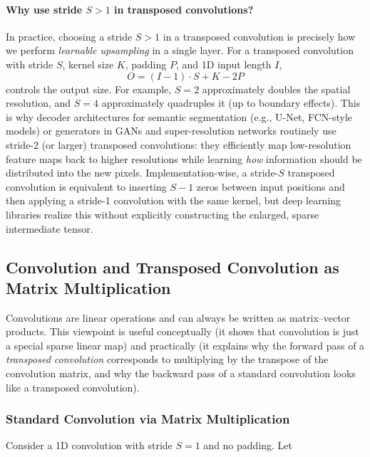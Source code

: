 \paragraph{Why use stride \(S>1\) in transposed convolutions?}
\noindent
In practice, choosing a stride \(S>1\) in a transposed convolution is precisely how we perform \emph{learnable upsampling} in a single layer. For a transposed convolution with stride \(S\), kernel size \(K\), padding \(P\), and 1D input length \(I\),
\[
O = (I - 1)\cdot S + K - 2P
\]
controls the output size. For example, \(S=2\) approximately doubles the spatial resolution, and \(S=4\) approximately quadruples it (up to boundary effects). This is why decoder architectures for semantic segmentation (e.g., U-Net, FCN-style models) or generators in GANs and super-resolution networks routinely use stride-2 (or larger) transposed convolutions: they efficiently map low-resolution feature maps back to higher resolutions while learning \emph{how} information should be distributed into the new pixels. Implementation-wise, a stride-\(S\) transposed convolution is equivalent to inserting \(S-1\) zeros between input positions and then applying a stride-1 convolution with the same kernel, but deep learning libraries realize this without explicitly constructing the enlarged, sparse intermediate tensor.

\subsection{Convolution and Transposed Convolution as Matrix Multiplication}
\label{subsec:chapter15_conv_matrix_form}

\noindent
Convolutions are linear operations and can always be written as matrix--vector products. This viewpoint is useful conceptually (it shows that convolution is just a special sparse linear map) and practically (it explains why the forward pass of a \emph{transposed convolution} corresponds to multiplying by the transpose of the convolution matrix, and why the backward pass of a standard convolution looks like a transposed convolution).

\newpage

\subsubsection{Standard Convolution via Matrix Multiplication}

\noindent
Consider a 1D convolution with stride \(S=1\) and no padding. Let

